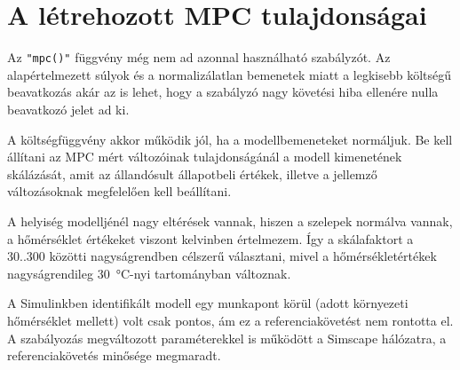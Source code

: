 


\section{A létrehozott MPC tulajdonságai}

Az \verb|"mpc()"| függvény még nem ad azonnal használható szabályzót. Az alapértelmezett súlyok és a normalizálatlan bemenetek miatt a legkisebb költségű beavatkozás akár az is lehet, hogy a szabályzó nagy követési hiba ellenére nulla beavatkozó jelet ad ki.

A költségfüggvény akkor működik jól, ha a modellbemeneteket normáljuk. Be kell állítani az MPC mért változóinak tulajdonságánál a modell kimenetének  skálázását, amit az állandósult állapotbeli értékek, illetve a jellemző változásoknak megfelelően kell beállítani.

A helyiség modelljénél nagy eltérések vannak, hiszen a szelepek normálva vannak, a hőmérséklet értékeket viszont kelvinben értelmezem. Így a skálafaktort a 30..300 közötti nagyságrendben célszerű választani, mivel a hőmérsékletértékek nagyságrendileg \SI{30}{\degreeCelsius}-nyi tartományban változnak.

A Simulinkben identifikált modell egy munkapont körül (adott környezeti hőmérséklet mellett) volt csak pontos, ám ez a referenciakövetést nem rontotta el. A szabályozás megváltozott paraméterekkel is működött a Simscape hálózatra, a referenciakövetés minősége megmaradt.





